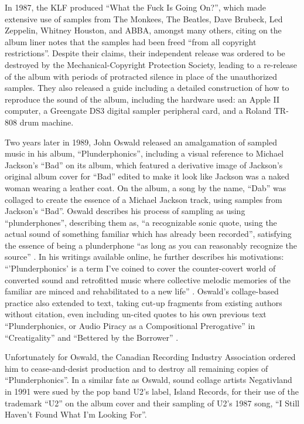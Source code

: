 \documentclass[a4paper,10pt,final]{ThesisStyle}
\begin{document}
In 1987, the KLF produced ``What the Fuck Is Going On?'', which made extensive use of samples from The Monkees, The Beatles, Dave Brubeck, Led Zeppelin, Whitney Houston, and ABBA, amongst many others, citing on the album liner notes that the samples had been freed ``from all copyright restrictions''.  Despite their claims, their independent release was ordered to be destroyed by the Mechanical-Copyright Protection Society, leading to a re-release of the album with periods of protracted silence in place of the unauthorized samples.  They also released a guide including a detailed construction of how to reproduce the sound of the album, including the hardware used: an Apple II computer, a Greengate DS3 digital sampler peripheral card, and a Roland TR-808 drum machine.  

Two years later in 1989, John Oswald released an amalgamation of sampled music in his album, ``Plunderphonics'', including a visual reference to Michael Jackson's ``Bad'' on its album, which featured a derivative image of Jackson's original album cover for ``Bad'' edited to make it look like Jackson was a naked woman wearing a leather coat.  On the album, a song by the name, ``Dab''  was collaged to create the essence of a Michael Jackson track, using samples from Jackson's ``Bad''.  Oswald describes his process of sampling as using ``plunderphones'', describing them as, ``a recognizable sonic quote, using the actual sound of something familiar which has already been recorded'', satisfying the essence of being a plunderphone ``as long as you can reasonably recognize the source'' \cite{OswaldInterviews}.  In his writings available online, he further describes his motivations: ``'Plunderphonics' is a term I've coined to cover the counter-covert world of converted sound and retrofitted music where collective melodic memories of the familiar are minced and rehabilitated to a new life'' \cite{Steenhuisen2005}.  Oswald's collage-based practice also extended to text, taking cut-up fragments from existing authors without citation, even including un-cited quotes to his own previous text ``Plunderphonics, or Audio Piracy as a Compositional Prerogative'' in ``Creatigality'' and ``Bettered by the Borrower'' \cite{Tholl}.   

Unfortunately for Oswald, the Canadian Recording Industry Association ordered him to cease-and-desist production and to destroy all remaining copies of ``Plunderphonics''.   In a similar fate as Oswald, sound collage artists Negativland in 1991 were sued by the pop band U2's label, Island Records, for their use of the trademark ``U2'' on the album cover and their sampling of U2's 1987 song, ``I Still Haven't Found What I'm Looking For''.   
\end{document}
